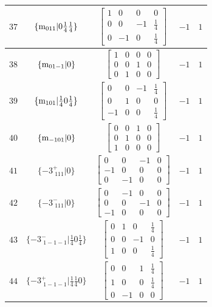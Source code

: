 \documentclass[fleqn,8pt]{jsarticle}
\begin{document}
\begin{longtable}{ccccc}
$ 37 $ & $ \{{\rm m}_{011}|0 \frac{1}{4} \frac{1}{4}\} $ & $ \begin{bmatrix} 1 & 0 & 0 & 0 \\ 0 & 0 & -1 & \frac{1}{4} \\ 0 & -1 & 0 & \frac{1}{4} \end{bmatrix} $ & $ -1 $ & $ 1 $ \\ \hline
$ 38 $ & $ \{{\rm m}_{01-1}|0\} $ & $ \begin{bmatrix} 1 & 0 & 0 & 0 \\ 0 & 0 & 1 & 0 \\ 0 & 1 & 0 & 0 \end{bmatrix} $ & $ -1 $ & $ 1 $ \\ \hline
$ 39 $ & $ \{{\rm m}_{101}|\frac{1}{4} 0 \frac{1}{4}\} $ & $ \begin{bmatrix} 0 & 0 & -1 & \frac{1}{4} \\ 0 & 1 & 0 & 0 \\ -1 & 0 & 0 & \frac{1}{4} \end{bmatrix} $ & $ -1 $ & $ 1 $ \\ \hline
$ 40 $ & $ \{{\rm m}_{-101}|0\} $ & $ \begin{bmatrix} 0 & 0 & 1 & 0 \\ 0 & 1 & 0 & 0 \\ 1 & 0 & 0 & 0 \end{bmatrix} $ & $ -1 $ & $ 1 $ \\ \hline
$ 41 $ & $ \{-3^{+}_{\,\,111}|0\} $ & $ \begin{bmatrix} 0 & 0 & -1 & 0 \\ -1 & 0 & 0 & 0 \\ 0 & -1 & 0 & 0 \end{bmatrix} $ & $ -1 $ & $ 1 $ \\ \hline
$ 42 $ & $ \{-3^{-}_{\,\,111}|0\} $ & $ \begin{bmatrix} 0 & -1 & 0 & 0 \\ 0 & 0 & -1 & 0 \\ -1 & 0 & 0 & 0 \end{bmatrix} $ & $ -1 $ & $ 1 $ \\ \hline
$ 43 $ & $ \{-3^{-}_{\,\,1-1-1}|\frac{1}{4} 0 \frac{1}{4}\} $ & $ \begin{bmatrix} 0 & 1 & 0 & \frac{1}{4} \\ 0 & 0 & -1 & 0 \\ 1 & 0 & 0 & \frac{1}{4} \end{bmatrix} $ & $ -1 $ & $ 1 $ \\ \hline
$ 44 $ & $ \{-3^{+}_{\,\,1-1-1}|\frac{1}{4} \frac{1}{4} 0\} $ & $ \begin{bmatrix} 0 & 0 & 1 & \frac{1}{4} \\ 1 & 0 & 0 & \frac{1}{4} \\ 0 & -1 & 0 & 0 \end{bmatrix} $ & $ -1 $ & $ 1 $ \\ \hline

\end{longtable}
\end{document}
